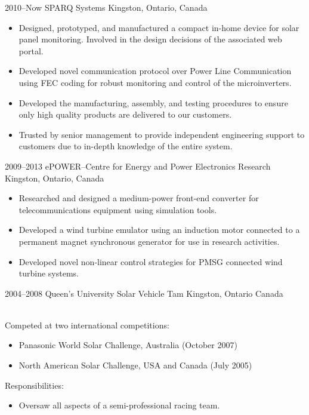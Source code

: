 \documentclass[]{cv-style}          %
\begin{document}
\begin{entrylist}
\entry
  {2010--Now}
  {SPARQ Systems}
  {Kingston, Ontario, Canada}
  {
\begin{itemize}
\item Designed, prototyped, and manufactured a compact in-home device for solar panel monitoring. Involved in the design decisions of the associated web portal.
\item Developed novel communication protocol over Power Line Communication using FEC coding for robust monitoring and control of the microinverters.
\item Developed the manufacturing, assembly, and testing procedures to ensure only high quality products are delivered to our customers.
\item Trusted by senior management to provide independent engineering support to customers due to in-depth knowledge of the entire system.
\end{itemize}
}
\entry
  {2009--2013}
  {ePOWER--Centre for Energy and Power Electronics Research}
  {Kingston, Ontario, Canada}
  {
  \begin{itemize}
    \item Researched and designed a medium-power front-end converter for telecommunications equipment using simulation tools. 
    \item Developed a wind turbine emulator using an induction motor connected to a permanent magnet synchronous generator for use in research activities.
    \item Developed novel non-linear control strategies for PMSG connected wind turbine systems.
  \end{itemize}}
\entry
  {2004--2008}
  {Queen's University Solar Vehicle Tam}
  {Kingston, Ontario Canada}
  {\\
  Competed at two international competitions:
  \begin{itemize}
    \item Panasonic World Solar Challenge, Australia (October 2007)
    \item North American Solar Challenge, USA and Canada (July 2005)
  \end{itemize}
  Responsibilities:
  \begin{itemize}
    \item Oversaw all aspects of a semi-professional racing team.

\end{itemize}}
\end{entrylist}
\end{document}
